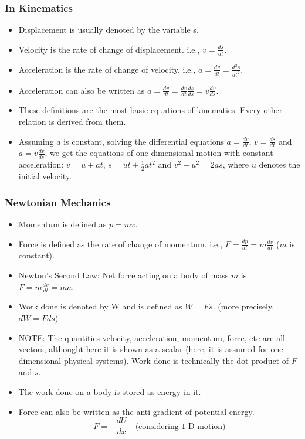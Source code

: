 \documentclass[10pt]{beamer}
\begin{document}
\begin{frame}
    \frametitle{In Kinematics}
    \begin{itemize}
        \item Displacement is usually denoted by the variable s.
        \item Velocity is the rate of change of displacement. i.e., $v = \frac{ds}{dt}$.
        \item Acceleration is the rate of change of velocity. i.e., $a = \frac{dv}{dt} = \frac{d^2s}{dt^2}$.
        \item Acceleration can also be written as $a = \frac{dv}{dt} = \frac{dv}{dt} \frac{ds}{ds} = v \frac{dv}{ds}$.
        \item These definitions are the most basic equations of kinematics. Every other relation is derived from them.
        \item Assuming $a$ is constant, solving the differential equations $a = \frac{dv}{dt}$, $v = \frac{ds}{dt}$ and $a = v \frac{dv}{ds}$, we get the equations of one dimensional motion with constant acceleration: $v = u + at$, $s = ut + \frac{1}{2}at^2$ and $v^2 - u^2 = 2as$, where $u$ denotes the initial velocity.
    \end{itemize}
\end{frame}

\begin{frame}
    \fontsize{9pt}{10pt}\selectfont
    \frametitle{Newtonian Mechanics}
    \begin{itemize}
        \item Momentum is defined as $p = mv$.
        \item Force is defined as the rate of change of momentum. i.e., $F = \frac{dp}{dt} = m \frac{dv}{dt}$ ($m$ is constant).
        \item Newton's Second Law: Net force acting on a body of mass $m$ is $F = m \frac{dv}{dt} = ma$.
        \item Work done is denoted by W and is defined as $W = Fs$. (more precisely, $dW = F ds$)
        \item NOTE: The quantities velocity, acceleration, momentum, force, etc are all vectors, althought here it is shown as a scalar (here, it is assumed for one dimensional physical systems). Work done is technically the dot product of $F$ and $s$.
        \item The work done on a body is stored as energy in it.
        \item Force can also be written as the anti-gradient of potential energy.
            $$
            F = - \frac{dU}{dx} \quad \textrm{(considering 1-D motion)}
            $$
    \end{itemize}
\end{frame}
\end{document}
